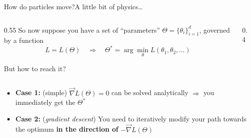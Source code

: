 \begin{frame}{How do particles move?}{A little bit of physics\dots}
    \begin{columns}[c]
        \begin{column}{0.55\textwidth}
            So now suppose you have a set of \enquote{parameters} $\Theta = \{ \theta_i \}_{i = 1}^d$, governed by a function
            \begin{equation*}
                L = L(\Theta)
                \quad \Rightarrow \quad
                \Theta^* = \arg\min\limits_{\theta} L(\theta_1, \theta_2, \dots)
            \end{equation*}

            But how to reach it?
        \end{column}
        \hfil
        \begin{column}{0.4\textwidth}
            \centering
            
        \end{column}
    \end{columns}

    \vfill \pause

    \begin{itemize}
        \item \textbf{Case 1:} (simple) $\vec{\nabla} L(\Theta) = 0$ can be solved analytically $\Rightarrow$ you immediately get the $\Theta^*$
        \item \textbf{Case 2:} (\emph{gradient descent}) You need to iteratively modify your path towards the optimum \textbf{in the direction of} $-\vec{\nabla} L(\Theta)$
    \end{itemize}
\end{frame}

